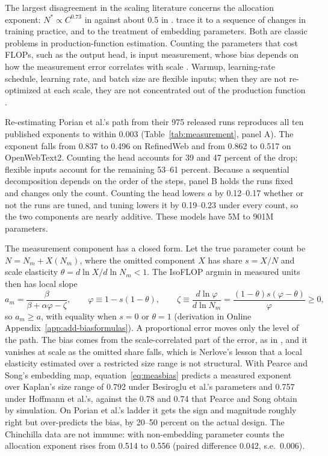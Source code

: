 The largest disagreement in the scaling literature concerns the allocation exponent: $N^*\propto C^{0.73}$ in
\citet{kaplan2020scaling} against about 0.5 in \citet{hoffmann2022training}. \citet{porian2024resolving} trace it to a
sequence of changes in training practice, and \citet{pearce2024reconciling} to the treatment of embedding parameters.
Both are classic problems in production-function estimation. Counting the parameters that cost FLOPs, such as the
output head, is input measurement, whose bias depends on how the measurement error
correlates with scale \citep{nerlove1963returns,christensen1976economies,collardwexler2016production}. Warmup,
learning-rate schedule, learning rate, and batch size are flexible inputs; when they are not re-optimized at each
scale, they are not concentrated out of the production function \citep{ackerberg2015identification,gandhi2020identification}.



Re-estimating Porian et al.'s path from their 975 released runs reproduces all ten published exponents to within
0.003 (Table~\ref{tab:measurement}, panel A). The exponent falls from 0.837 to 0.496 on RefinedWeb and from 0.862 to
0.517 on OpenWebText2. Counting the head accounts for 39 and 47 percent of the drop; flexible inputs account for the
remaining 53--61 percent. Because a sequential decomposition depends on the order of the steps, panel B holds the runs
fixed and changes only the count. Counting the head lowers $a$ by 0.12--0.17 whether or not the runs are tuned, and
tuning lowers it by 0.19--0.23 under every count, so the two components are nearly additive. These models have 5M to
901M parameters.

The measurement component has a closed form. Let the true parameter count be $N=N_m+X(N_m)$, where the omitted
component $X$ has share $s=X/N$ and scale elasticity $\theta=d\ln X/d\ln N_m<1$. The IsoFLOP argmin in measured units
then has local slope
\begin{equation}\label{eq:measbias}
a_m=\frac{\beta}{\beta+\alpha\varphi-\zeta},\qquad \varphi\equiv1-s(1-\theta),\qquad
\zeta\equiv\frac{d\ln\varphi}{d\ln N_m}=\frac{(1-\theta)s(\varphi-\theta)}{\varphi}\ge0,
\end{equation}
so $a_m\ge a$, with equality when $s=0$ or $\theta=1$ (derivation in Online Appendix~\ref{app:add-biasformulas}). A proportional error moves
only the level of the path. The bias comes from the scale-correlated part of the error, as in
\citet{collardwexler2016production}, and it vanishes at scale as the omitted share falls, which is Nerlove's lesson
that a local elasticity estimated over a restricted size range is not structural. With Pearce and Song's embedding
map, equation~\eqref{eq:measbias} predicts a measured exponent over Kaplan's size range of 0.792 under Besiroglu et
al.'s parameters and 0.757 under Hoffmann et al.'s, against the 0.78 and 0.74 that Pearce and Song obtain by
simulation. On Porian et al.'s ladder it gets the sign and magnitude roughly right but over-predicts the bias, by 20--50
percent on the actual design. The Chinchilla data are not immune: with non-embedding parameter counts the allocation
exponent rises from 0.514 to 0.556 (paired difference 0.042, s.e.\ 0.006).

